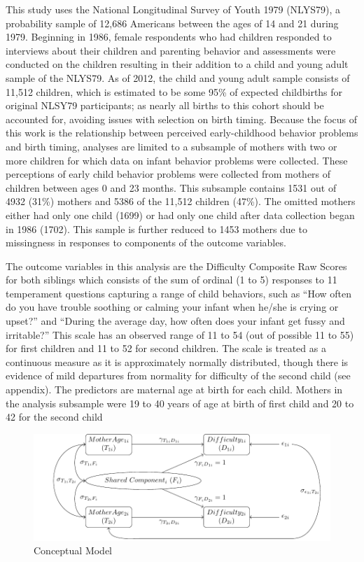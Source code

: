 \documentclass[]{article}
\begin{document}
This study uses the National Longitudinal Survey of Youth 1979 (NLYS79),
a probability sample of 12,686 Americans between the ages of 14 and 21
during 1979. Beginning in 1986, female respondents who had children
responded to interviews about their children and parenting behavior and
assessments were conducted on the children resulting in their addition
to a child and young adult sample of the NLYS79. As of 2012, the child
and young adult sample consists of 11,512 children, which is estimated
to be some 95\% of expected childbirths for original NLSY79
participants; as nearly all births to this cohort should be accounted
for, avoiding issues with selection on birth timing. Because the focus
of this work is the relationship between perceived early-childhood
behavior problems and birth timing, analyses are limited to a subsample
of mothers with two or more children for which data on infant behavior
problems were collected. These perceptions of early child behavior
problems were collected from mothers of children between ages 0 and 23
months. This subsample contains 1531 out of 4932 (31\%) mothers and 5386
of the 11,512 children (47\%). The omitted mothers either had only one
child (1699) or had only one child after data collection began in 1986
(1702). This sample is further reduced to 1453 mothers due to
missingness in responses to components of the outcome variables.

The outcome variables in this analysis are the Difficulty Composite Raw
Scores for both siblings which consists of the sum of ordinal (1 to 5)
responses to 11 temperament questions capturing a range of child
behaviors, such as ``How often do you have trouble soothing or calming
your infant when he/she is crying or upset?'' and ``During the average
day, how often does your infant get fussy and irritable?'' This scale
has an observed range of 11 to 54 (out of possible 11 to 55) for first
children and 11 to 52 for second children. The scale is treated as a
continuous measure as it is approximately normally distributed, though
there is evidence of mild departures from normality for difficulty of
the second child (see appendix). The predictors are maternal age at
birth for each child. Mothers in the analysis subsample were 19 to 40
years of age at birth of first child and 20 to 42 for the second child

\begin{figure}
\includegraphics[width=0.8\linewidth]{diagram_model} \caption{Conceptual Model}\label{fig:diagrammodel}
\end{figure}
\end{document}
